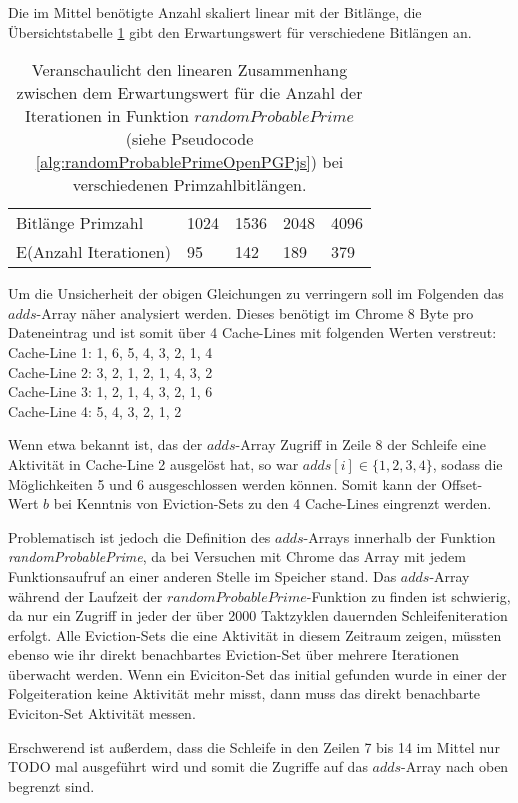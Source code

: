 Die im Mittel benötigte Anzahl skaliert linear mit der Bitlänge, die Übersichtstabelle \ref{tbl:bitLengthNumberOfIterations} gibt den Erwartungswert für verschiedene Bitlängen an.
\begin{table}[h]
\label{tbl:bitLengthNumberOfIterations}
\caption{Veranschaulicht den linearen Zusammenhang zwischen dem Erwartungswert für die Anzahl der Iterationen in Funktion $randomProbablePrime$ (siehe Pseudocode \ref{alg:randomProbablePrimeOpenPGPjs}) bei verschiedenen Primzahlbitlängen.}
\begin{tabular}{lllll}
Bitlänge Primzahl     & 1024 & 1536 & 2048 & 4096 \\
E(Anzahl Iterationen) & 95   & 142  & 189  & 379 
\end{tabular}
\end{table}

Um die Unsicherheit der obigen Gleichungen zu verringern soll im Folgenden das $adds$-Array näher analysiert werden.
Dieses benötigt im Chrome 8 Byte pro Dateneintrag und ist somit über 4 Cache-Lines mit folgenden Werten verstreut:\\
Cache-Line 1: 1, 6, 5, 4, 3, 2, 1, 4\\
Cache-Line 2: 3, 2, 1, 2, 1, 4, 3, 2\\
Cache-Line 3: 1, 2, 1, 4, 3, 2, 1, 6\\
Cache-Line 4: 5, 4, 3, 2, 1, 2

Wenn etwa bekannt ist, das der $adds$-Array Zugriff in Zeile 8 der Schleife eine Aktivität in Cache-Line 2 ausgelöst hat, so war $adds[i] \in \{1,2,3,4\}$, sodass die Möglichkeiten 5 und 6 ausgeschlossen werden können.
Somit kann der Offset-Wert $b$ bei Kenntnis von Eviction-Sets zu den 4 Cache-Lines eingrenzt werden.

Problematisch ist jedoch die Definition des $adds$-Arrays innerhalb der Funktion \textit{randomProbablePrime}, da bei Versuchen mit Chrome das Array mit jedem Funktionsaufruf an einer anderen Stelle im Speicher stand.
Das $adds$-Array während der Laufzeit der $randomProbablePrime$-Funktion zu finden ist schwierig, da nur ein Zugriff in jeder der über 2000 Taktzyklen dauernden Schleifeniteration erfolgt.
Alle Eviction-Sets die eine Aktivität in diesem Zeitraum zeigen, müssten ebenso wie ihr direkt benachbartes Eviction-Set über mehrere Iterationen überwacht werden.
Wenn ein Eviciton-Set das initial gefunden wurde in einer der Folgeiteration keine Aktivität mehr misst, dann muss das direkt benachbarte Eviciton-Set Aktivität messen.

Erschwerend ist außerdem, dass die Schleife in den Zeilen 7 bis 14 im Mittel nur TODO mal ausgeführt wird und somit die Zugriffe auf das $adds$-Array nach oben begrenzt sind.

